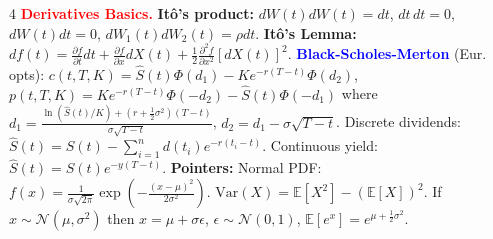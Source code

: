 \documentclass[landscape]{article}
\begin{document}
\begin{multicols}{4}
\textcolor{red}{\textbf{Derivatives Basics.}}
\textbf{Itô's product:} $dW(t)dW(t)=dt$, $dt\,dt=0$, $dW(t)dt=0$, $dW_1(t)dW_2(t)=\rho dt$.
\textbf{Itô's Lemma:} $df(t)=\frac{\partial f}{\partial t}dt+\frac{\partial f}{\partial x}dX(t)+\frac{1}{2}\frac{\partial^2 f}{\partial x^2}[dX(t)]^2$.
\textcolor{blue}{\textbf{Black-Scholes-Merton}} (Eur. opts): $c(t,T,K)=\hat{S}(t)\Phi(d_1)-Ke^{-r(T-t)}\Phi(d_2)$, $p(t,T,K)=Ke^{-r(T-t)}\Phi(-d_2)-\hat{S}(t)\Phi(-d_1)$ where $d_1=\frac{\ln(\hat{S}(t)/K)+(r+\frac{1}{2}\sigma^2)(T-t)}{\sigma\sqrt{T-t}}$, $d_2=d_1-\sigma\sqrt{T-t}$. Discrete dividends: $\hat{S}(t)=S(t)-\sum_{i=1}^n d(t_i)e^{-r(t_i-t)}$. Continuous yield: $\hat{S}(t)=S(t)e^{-y(T-t)}$.
\textbf{Pointers:} Normal PDF: $f(x)=\frac{1}{\sigma\sqrt{2\pi}}\exp(-\frac{(x-\mu)^2}{2\sigma^2})$. $\text{Var}(X)=\mathbb{E}[X^2]-(\mathbb{E}[X])^2$. If $x\sim\mathcal{N}(\mu,\sigma^2)$ then $x=\mu+\sigma\epsilon$, $\epsilon\sim\mathcal{N}(0,1)$, $\mathbb{E}[e^x]=e^{\mu+\frac{1}{2}\sigma^2}$.

\end{multicols}
\end{document}
